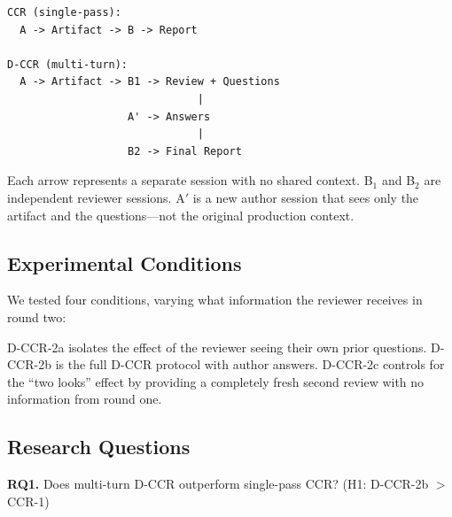 \documentclass[11pt]{article}
\begin{document}
{\small
\begin{verbatim}
CCR (single-pass):
  A -> Artifact -> B -> Report

D-CCR (multi-turn):
  A -> Artifact -> B1 -> Review + Questions
                              |
                   A' -> Answers
                              |
                   B2 -> Final Report
\end{verbatim}
}

Each arrow represents a separate session with no shared context.
B$_1$ and B$_2$ are independent reviewer sessions.
A$'$ is a new author session that sees only the artifact and the questions---not the original production context.

\subsection{Experimental Conditions}

We tested four conditions, varying what information the reviewer receives in round two:

\begin{table}[h]
\centering
{}
\end{table}

D-CCR-2a isolates the effect of the reviewer seeing their own prior questions.
D-CCR-2b is the full D-CCR protocol with author answers.
D-CCR-2c controls for the ``two looks'' effect by providing a completely fresh second review with no information from round one.

\subsection{Research Questions}

\textbf{RQ1.} Does multi-turn D-CCR outperform single-pass CCR? (H1: D-CCR-2b $>$ CCR-1)
\end{document}
